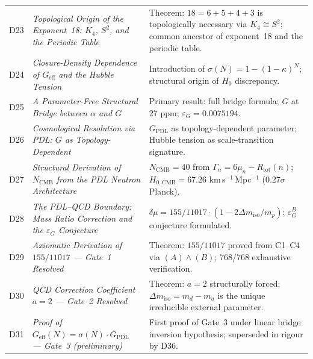 \documentclass[11pt,a4paper]{article}
\theoremstyle{plain}
\theoremstyle{definition}
\theoremstyle{remark}
\newcommand{\Kfour}{K_4}
\newcommand{\Geff}{G_{\mathrm{eff}}}
\newcommand{\GPDL}{G_{\mathrm{PDL}}}
\newcommand{\epsG}{\varepsilon_G}
\newcommand{\Rtot}{R_{\mathrm{tot}}}
\newcommand{\sigmaN}{\sigma(N)}
\begin{document}
\begin{longtable}{@{}L{1.3cm}L{3.8cm}L{8.0cm}@{}}
D23 & \textit{Topological Origin of the Exponent~18: $\Kfour$, $S^2$, and the Periodic Table}~\citep{D23} & \textcolor{proofblue}{Theorem}: $18=6+5+4+3$ is topologically necessary via $\Kfour\cong S^2$; common ancestor of exponent~18 and the periodic table. \\[0.3em]

D24 & \textit{Closure-Density Dependence of $\Geff$ and the Hubble Tension}~\citep{D24} & Introduction of $\sigmaN=1-(1-\kappa)^N$; structural origin of $H_0$ discrepancy. \\[0.3em]

D25 & \textit{A Parameter-Free Structural Bridge between $\alpha$ and $G$}~\citep{D25} & \textcolor{proofblue}{Primary result}: full bridge formula; $G$ at 27 ppm; $\epsG=0.0075194$. \\[0.3em]

D26 & \textit{Cosmological Resolution via PDL: $G$ as Topology-Dependent}~\citep{D26} & $\GPDL$ as topology-dependent parameter; Hubble tension as scale-transition signature. \\[0.3em]

D27 & \textit{Structural Derivation of $N_{\mathrm{CMB}}$ from the PDL Neutron Architecture}~\citep{D27} & $N_{\mathrm{CMB}}=40$ from $\Gamma_n=6\mu_n-\Rtot(n)$; $H_{0,\mathrm{CMB}}=67.26$ km\,s$^{-1}$\,Mpc$^{-1}$ (0.27$\sigma$ Planck). \\[0.3em]

D28 & \textit{The PDL--QCD Boundary: Mass Ratio Correction and the $\epsG$ Conjecture}~\citep{D28} & $\delta\mu=155/11017\cdot(1-2\Delta m_{\mathrm{iso}}/m_p)$; $\epsG^B$ conjecture formulated. \\[0.3em]

D29 & \textit{Axiomatic Derivation of $155/11017$ — Gate~1 Resolved}~\citep{D29} & \textcolor{proofblue}{Theorem}: $155/11017$ proved from C1--C4 via $(A)\wedge(B)$; 768/768 exhaustive verification. \\[0.3em]

D30 & \textit{QCD Correction Coefficient $a=2$ — Gate~2 Resolved}~\citep{D30} & \textcolor{proofblue}{Theorem}: $a=2$ structurally forced; $\Delta m_{\mathrm{iso}}=m_d-m_u$ is the unique irreducible external parameter. \\[0.3em]

D31 & \textit{Proof of $\Geff(N)=\sigmaN\cdot\GPDL$ — Gate~3 (preliminary)}~\citep{D31} & First proof of Gate~3 under linear bridge inversion hypothesis; superseded in rigour by D36. \\[0.3em]


\end{longtable}
\end{document}
